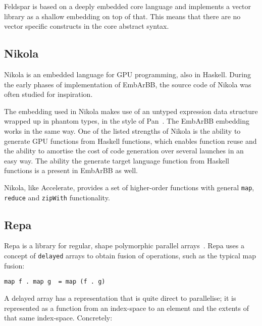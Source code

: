 Feldspar is based on a deeply embedded core language and implements 
a vector library as a shallow embedding on top of that. 
This means that there are no vector specific 
constructs in the core abstract syntax. 




\subsection{Nikola} 
Nikola is an embedded language for GPU programming\cite{NIKOLA}, also
in Haskell.  
During the early phases of implementation of EmbArBB, the source code of 
Nikola was often studied for inspiration.

The embedding used in Nikola makes use of an untyped expression 
data structure wrapped up in phantom types, in the style of Pan~\cite{ELLIJFP}.
The EmbArBB embedding works in the same way. 
One of the listed strengths of Nikola is the ability to generate GPU functions 
from Haskell functions, which enables function reuse and the ability to 
amortise the cost of code generation over several launches in an easy 
way. The ability the generate target language function from Haskell functions 
is a present in EmbArBB as well. 

Nikola, like Accelerate, provides a set of higher-order functions with
general {\tt map}, {\tt reduce} and {\tt zipWith} functionality.

\subsection{Repa} 
Repa is a library for regular, shape polymorphic parallel arrays~\cite{REPA}. Repa 
uses a concept of {\tt delayed} arrays to obtain fusion of operations, such as the 
typical map fusion:
\begin{verbatim}
map f . map g  = map (f . g)
\end{verbatim} 
A delayed array 
has a representation that is quite direct to parallelise; it is represented 
as a function from an index-space to an element and the extents of that same 
index-space. Concretely: 

